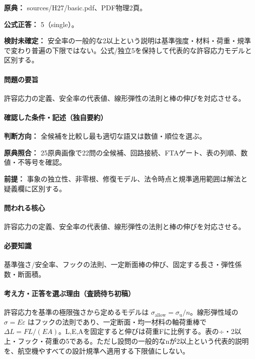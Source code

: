 \noindent\textbf{原典：} sources/H27/basic.pdf、PDF物理2頁。

\textbf{公式正答：} 5（single）。

\par\textbf{検討未確定：} 安全率の一般的な2以上という説明は基準強度・材料・荷重・規準で変わり普遍の下限ではない。公式/独立5を保持して代表的な許容応力モデルと区別する。

\paragraph{問題の要旨} 許容応力の定義、安全率の代表値、線形弾性の法則と棒の伸びを対応させる。

\paragraph{確認した条件・記述（独自要約）}\mbox{}\par

\noindent\textbf{判断方向：} 全候補を比較し最も適切な語又は数値・順位を選ぶ。\par

\noindent\textbf{原典照合：} 25原典画像で22問の全候補、回路接続、FTAゲート、表の列順、数値・不等号を確認。\par

\noindent\textbf{前提：} 事象の独立性、非零根、修復モデル、法令時点と規準適用範囲は解法と疑義欄に区別する。\par

\paragraph{問われる核心} 許容応力の定義、安全率の代表値、線形弾性の法則と棒の伸びを対応させる。

\paragraph{必要知識} 基準強さ/安全率、フックの法則、一定断面棒の伸び、固定する長さ・弾性係数・断面積。

\paragraph{考え方・正答を選ぶ理由（査読待ち初稿）} 許容応力を基準の極限強さから定めるモデルは \(\sigma_{\mathrm{allow}}=\sigma_{\mathrm{u}}/n\)。線形弾性域の \(\sigma=E\varepsilon\) はフックの法則であり、一定断面・均一材料の軸荷重棒で \(\Delta L=FL/(EA)\)。L,E,Aを固定すると伸びは荷重Fに比例する。表の÷・2以上・フック・荷重の5である。ただし設問の一般的なnが2以上という代表的説明を、航空機やすべての設計規準へ適用する下限値にしない。

